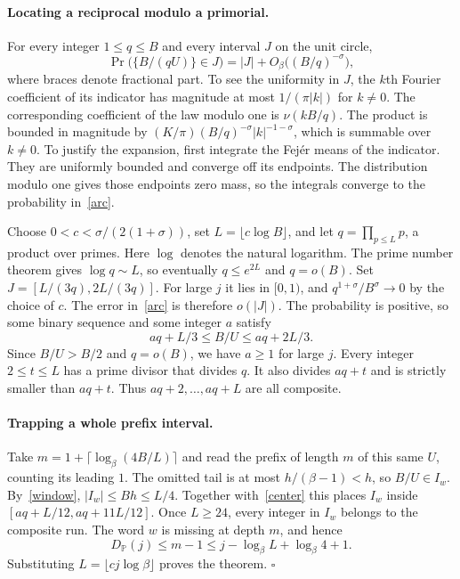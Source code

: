 \documentclass[11pt,a4paper]{article}
\newcommand{\DP}{D_{\mathbb P}}
\begin{document}
\paragraph{Locating a reciprocal modulo a primorial.}
For every integer $1\le q\le B$ and every interval $J$ on the unit circle,
\begin{equation}\label{arc}
 \Pr\big(\{B/(qU)\}\in J\big)=|J|+O_\beta\big((B/q)^{-\sigma}\big),
\end{equation}
where braces denote fractional part. To see the uniformity in $J$,
the $k$th Fourier coefficient of its indicator has magnitude at most
$1/(\pi |k|)$ for $k\ne0$. The corresponding coefficient of the law
modulo one is $\widehat\nu(kB/q)$. The product is bounded in magnitude
by $(K/\pi)(B/q)^{-\sigma}|k|^{-1-\sigma}$, which is summable over
$k\ne0$. To justify the expansion, first integrate the Fej\'er means of
the indicator. They are uniformly bounded and converge off its endpoints.
The distribution modulo one gives those endpoints zero mass, so the
integrals converge to the probability in~\eqref{arc}.

Choose $0<c<\sigma/(2(1+\sigma))$, set $L=\lfloor c\log B\rfloor$,
and let $q=\prod_{p\le L}p$, a product over primes. Here $\log$ denotes
the natural logarithm. The prime number theorem gives $\log q\sim L$, so
eventually $q\le e^{2L}$ and $q=o(B)$. Set $J=[L/(3q),2L/(3q)]$.
For large $j$ it lies in $[0,1)$, and $q^{1+\sigma}/B^\sigma\to0$ by
the choice of $c$. The error in~\eqref{arc} is therefore $o(|J|)$.
The probability is positive, so some binary sequence and some integer $a$
satisfy
\begin{equation}\label{center}
       aq+L/3\le B/U\le aq+2L/3 .
\end{equation}
Since $B/U>B/2$ and $q=o(B)$, we have $a\ge1$ for large $j$.
Every integer $2\le t\le L$ has a prime divisor that divides $q$.
It also divides $aq+t$ and is strictly smaller than $aq+t$.
Thus $aq+2,\ldots,aq+L$ are all composite.

\paragraph{Trapping a whole prefix interval.}
Take $m=1+\lceil\log_\beta(4B/L)\rceil$ and read the prefix of length $m$
of this same $U$, counting its leading $1$. The omitted tail is at most
$h/(\beta-1)<h$, so $B/U\in I_w$. By~\eqref{window}, $|I_w|\le Bh\le L/4$.
Together with~\eqref{center} this places $I_w$ inside
$[aq+L/12,aq+11L/12]$. Once $L\ge24$, every integer in $I_w$ belongs
to the composite run. The word $w$ is missing at depth $m$, and hence
\[
  \DP(j)\le m-1\le j-\log_\beta L+\log_\beta4+1 .
\]
Substituting $L=\lfloor c j\log\beta\rfloor$ proves the theorem.
\hfill$\square$
\end{document}
